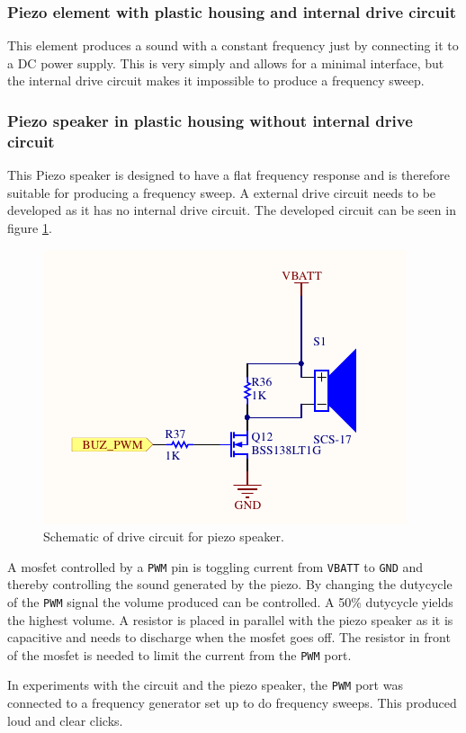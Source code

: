 \subsubsection*{Piezo element with plastic housing and internal drive circuit}
This element produces a sound with a constant frequency just by connecting it to a DC power supply. 
This is very simply and allows for a minimal interface, but the internal drive circuit makes it impossible to produce a frequency sweep. 

\subsubsection*{Piezo speaker in plastic housing without internal drive circuit}
This Piezo speaker is designed to have a flat frequency response and is therefore suitable for producing a frequency sweep. 
A external drive circuit needs to be developed as it has no internal drive circuit.
The developed circuit can be seen in figure \ref{fig:buzzer_circuit}.

\begin{figure}
	\centering
	\includegraphics[width=.6\linewidth]{graphics/buzzer_circuit.pdf}
	\caption{Schematic of drive circuit for piezo speaker.}
	\label{fig:buzzer_circuit}
\end{figure}

A mosfet controlled by a \texttt{PWM} pin is toggling current from \texttt{VBATT} to \texttt{GND} and thereby controlling the sound generated by the piezo.
By changing the dutycycle of the \texttt{PWM} signal the volume produced can be controlled. 
A 50\% dutycycle yields the highest volume. 
A resistor is placed in parallel with the piezo speaker as it is capacitive and needs to discharge when the mosfet goes off.
The resistor in front of the mosfet is needed to limit the current from the \texttt{PWM} port. 

In experiments with the circuit and the piezo speaker, the \texttt{PWM} port was connected to a frequency generator set up to do frequency sweeps.
This produced loud and clear clicks.

